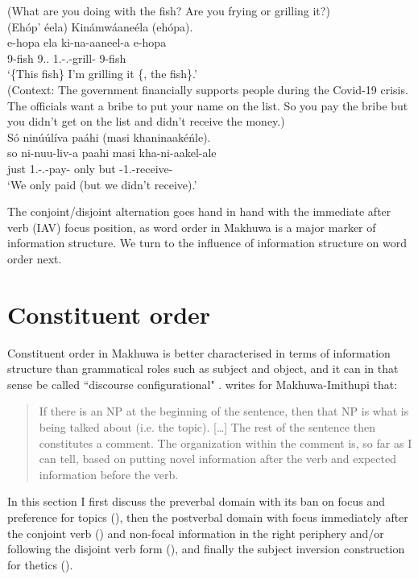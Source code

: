 \documentclass[output=paper]{langscibook}
\begin{document}
\ea
\label{bkm:Ref109490787}
(What are you doing with the fish? Are you frying or grilling it?)\\
(Ehóp’ éela) Kinámwáaneéla (ehópa).\\
\gll
e-hopa  ela  ki-na-aaneel-a  e-hopa\\
9-fish  9.\DEM{}.\PROX{}  1\SG{}.\SM{}-\PRS{}.\DJ{}-grill-\FV{}  9-fish\\
\glt
‘\{This fish\} I’m grilling it \{, the fish\}.’\\


\z
\pagebreak
\ea
\label{bkm:Ref129854789}
(Context: The government financially supports people during the Covid-19 crisis. The officials want a bribe to put your name on the list. So you pay the bribe but you didn’t get on the list and didn’t receive the money.)\\
Só ninúúlíva paáhi (masi khaninaakéńle).\\
\gll
so  ni-nuu-liv-a  paahi  masi  kha-ni-aakel-ale\\
just  1\PL{}.\SM{}-\PFV{}.\PERS{}-pay-\FV{}  only  but  \NEG{}-1\PL{}.\SM{}-receive-\PFV{}\\
\glt
‘We only paid (but we didn’t receive).’\\


\z

The conjoint/disjoint alternation goes hand in hand with the immediate after verb (IAV) focus position, as word order in Makhuwa is a major marker of information structure. We turn to the influence of information structure on word order next.

\section{Constituent order}
\label{bkm:Ref117578671}
Constituent order in Makhuwa is better characterised in terms of information structure than grammatical roles such as subject and object, and it can in that sense be called ``discourse configurational" \citep[see][]{KerrEtAl2023,É.Kiss1995,vanderWal2009a}. \citet[56]{Stucky1985} writes for Makhuwa-Imithupi that:
\begin{quote}
    If there is an NP at the beginning of the sentence, then that NP is what is being talked about (i.e. the topic). […] The rest of the sentence then constitutes a comment. The organization within the comment is, so far as I can tell, based on putting novel information after the verb and expected information before the verb. \citep[56]{Stucky1985}
\end{quote}
In this section I first discuss the preverbal domain with its ban on focus and preference for topics (), then the postverbal domain with focus immediately after the conjoint verb () and non\hyp focal information in the right periphery and\slash or following the disjoint verb form (), and finally the subject inversion construction for thetics ().
\end{document}
